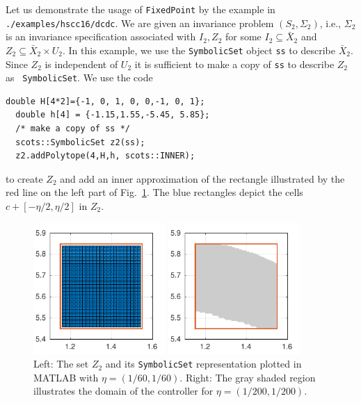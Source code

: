 \documentclass[a4paper]{amsart}
\newcommand{\intcc}[1]{\ensuremath{{\left[#1\right]}}}
\begin{document}
Let us demonstrate the usage of {\tt\small FixedPoint} by the example in
{\tt\small ./examples/hscc16/dcdc}. We are given an invariance problem $(S_2,\Sigma_2)$, i.e., $\Sigma_2$ is an invariance specification
associated with $I_2,Z_2$ for some $I_2\subseteq \bar X_2$ and $Z_2\subseteq
\bar X_2\times U_2$. In this example, we use the
{\tt\small SymbolicSet} object {\tt\small ss} to describe $\bar X_2$. Since $Z_2$ is independent of $U_2$ it is sufficient to
make a copy of {\tt\small ss} to describe $Z_2$ as {\tt\small
SymbolicSet}.
We use the code
\begin{lstlisting}[basicstyle=\footnotesize\ttfamily]
	double H[4*2]={-1, 0, 1, 0, 0,-1, 0, 1};
  double h[4] = {-1.15,1.55,-5.45, 5.85};                                                                                                                                                                                                                                                                                                                                  
  /* make a copy of ss */
  scots::SymbolicSet z2(ss);
  z2.addPolytope(4,H,h, scots::INNER);
\end{lstlisting}
to create $Z_2$ and add an inner approximation of the
rectangle illustrated by the red line on the left part of Fig.~\ref{f:dcdcsyn}.
The blue rectangles depict the cells $c+\intcc{-\eta/2,\eta/2}$ in $Z_2$. 
\begin{figure}[h]
\centering
\begin{minipage}{0.45\textwidth}
  \includegraphics[width=5cm]{figures/dcdcap}
\end{minipage}%
\begin{minipage}{0.45\textwidth}
  \includegraphics[width=5cm]{figures/dcdcdom}
\end{minipage}
\caption{Left: The set $Z_2$ and its {\tt\small SymbolicSet} representation
  plotted in MATLAB with $\eta=(1/60,1/60)$. Right: The gray shaded region illustrates the domain of the
controller for $\eta=(1/200,1/200)$.}\label{f:dcdcsyn}
\end{figure}
\end{document}
